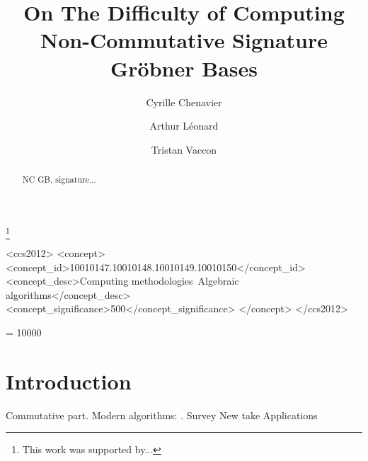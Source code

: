 \documentclass[sigconf]{acmart}
\theoremstyle{plain}
\theoremstyle{definition}
\theoremstyle{remark}
\begin{document}
\fancyhead{}

\title{On The Difficulty of Computing Non-Commutative Signature Gröbner Bases}

\author{Cyrille Chenavier}


\author{
  Arthur Léonard}

\author{
  Tristan Vaccon}


\thanks{This work was supported by...}


\begin{abstract}
NC GB, signature...\end{abstract}


\begin{CCSXML}
  <ccs2012>
  <concept>
  <concept_id>10010147.10010148.10010149.10010150</concept_id>
  <concept_desc>Computing methodologies~Algebraic algorithms</concept_desc>
  <concept_significance>500</concept_significance>
  </concept>
  </ccs2012>
\end{CCSXML}



\vspace{-1.5mm}






\maketitle

\widowpenalty = 10000
\addtolength{\textfloatsep}{-0.45cm} %

\section{Introduction}
Commutative part.
Modern algorithms:
\cite{F99,F5,FGLM}.
Survey \cite{EF17}
New take  \cite{G2V, GVW}
Applications \cite{LWXZ, CVV20, VVY21}
\end{document}
